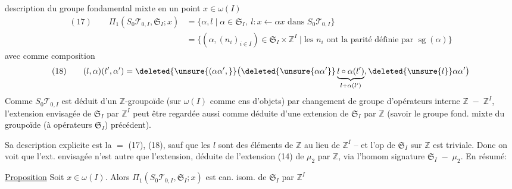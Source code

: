 description du groupe fondamental mixte en un point $x\in\omega(I)$
\[
\begin{aligned}
(17)\qquad\Pi_1(S_0\mathcal T_{0,I},\mathfrak S_I;x)
&=\{\alpha,l\mid\alpha\in\mathfrak S_I,\ l:x\longleftarrow\alpha x\text{ dans }S_0\mathcal T_{0,I}\}\\
&=\{(\alpha,(n_i)_{i\in I})\in\mathfrak S_I\times\mathbb Z^I\mid\text{les }n_i\text{ ont la parité définie par }\operatorname{sg}(\alpha)\}
\end{aligned}
\]
avec comme composition
\[
(18)\qquad(l,\alpha)(l',\alpha')=
\deleted{\unsure{(\alpha\alpha',}}
\bigl(\deleted{\unsure{\alpha\alpha'}}\underbrace{l\circ\alpha(l')}_{l+\alpha(l')},\deleted{\unsure{l}}\alpha\alpha'\bigr)
\]
Comme  $S_0\mathcal T_{0,I}$ est déduit d'un $\mathbb Z$-groupoïde (sur $\omega(I)$ comme ens d'objets) par changement de groupe d'opérateurs interne $\mathbb Z\;-\;\mathbb Z^I$, l'extension envisagée de $\mathfrak S_I$ par $\mathbb Z^I$ peut être regardée aussi comme déduite d'une extension de $\mathfrak S_I$ par $\mathbb Z$ (savoir le groupe fond. mixte  du groupoïde (à opérateurs $\mathfrak S_I$) précédent).

Sa description explicite est la $=$  (17), (18), sauf que les $l$ sont des éléments de $\mathbb Z$ au lieu de $\mathbb Z^I$ -- et l'op de $\mathfrak S_I$ sur $\mathbb Z$  est triviale. Donc on voit que l'ext. envisagée n'est autre que l'extension, déduite de l'extension (14) de $\mu_2$ par $\mathbb Z$, via l'homom signature $\mathfrak S_I\;-\;\mu_2$. En résumé:

\uline{Proposition} Soit $x\in\omega(I)$. Alors $\Pi_1(S_0\mathcal T_{0,I},\mathfrak S_I;x)$ est can. isom.  de $\mathfrak S_I$ par $\mathbb Z^I$
